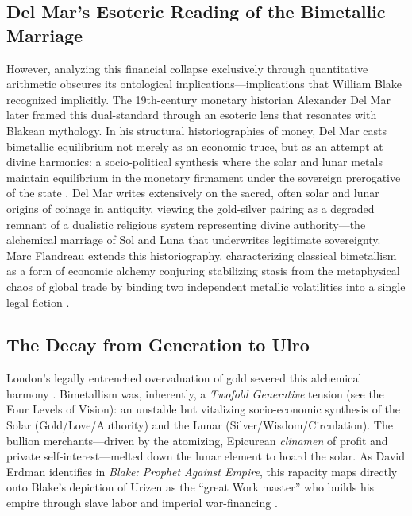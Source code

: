 \documentclass[
]{article}
\begin{document}
\subsection{Del Mar's Esoteric Reading of the Bimetallic
Marriage}\label{del-mars-esoteric-reading-of-the-bimetallic-marriage}

However, analyzing this financial collapse exclusively through
quantitative arithmetic obscures its ontological
implications---implications that William Blake recognized implicitly.
The 19th-century monetary historian Alexander Del Mar later framed this
dual-standard through an esoteric lens that resonates with Blakean
mythology. In his structural historiographies of money, Del Mar casts
bimetallic equilibrium not merely as an economic truce, but as an
attempt at divine harmonics: a socio-political synthesis where the solar
and lunar metals maintain equilibrium in the monetary firmament under
the sovereign prerogative of the state \citep{delmar1895history}. Del
Mar writes extensively on the sacred, often solar and lunar origins of
coinage in antiquity, viewing the gold-silver pairing as a degraded
remnant of a dualistic religious system representing divine
authority---the alchemical marriage of Sol and Luna that underwrites
legitimate sovereignty. Marc Flandreau extends this historiography,
characterizing classical bimetallism as a form of economic alchemy
conjuring stabilizing stasis from the metaphysical chaos of global trade
by binding two independent metallic volatilities into a single legal
fiction \citep{flandreau1996bimetallism}.

\subsection{The Decay from Generation to
Ulro}\label{the-decay-from-generation-to-ulro}

London's legally entrenched overvaluation of gold severed this
alchemical harmony \citep{quinn1996competing}. Bimetallism was,
inherently, a \emph{Twofold Generative} tension (see the Four Levels of
Vision): an unstable but vitalizing socio-economic synthesis of the
Solar (Gold/Love/Authority) and the Lunar (Silver/Wisdom/Circulation).
The bullion merchants---driven by the atomizing, Epicurean
\emph{clinamen} of profit and private self-interest---melted down the
lunar element to hoard the solar. As David Erdman identifies in
\emph{Blake: Prophet Against Empire}, this rapacity maps directly onto
Blake's depiction of Urizen as the ``great Work master'' who builds his
empire through slave labor and imperial war-financing
\citep{erdman1954prophet}.
\end{document}
